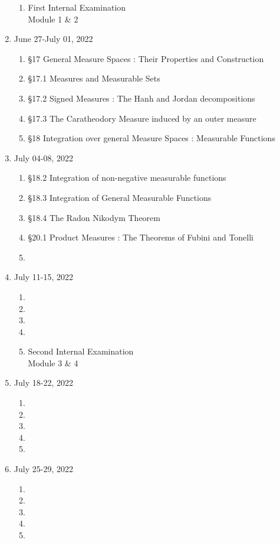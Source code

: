 \begin{enumerate}[label=Week \arabic*]
\begin{enumerate}[label=Day \arabic*]
		\item 
			First Internal Examination \\
			Module 1 \& 2
	\end{enumerate}
	\item June 27-July 01, 2022 
	\begin{enumerate}[label=Day \arabic*]
		\item 
			\S17 General Measure Spaces : Their Properties and Construction
		\item 
			\S17.1 Measures and Measurable Sets
		\item 
			\S17.2 Signed Measures : The Hanh and Jordan decompositions
		\item 
			\S17.3 The Caratheodory Measure induced by an outer measure
		\item 
			\S18 Integration over general Measure Spaces : Measurable Functions
	\end{enumerate}
	\item July 04-08, 2022 
	\begin{enumerate}[label=Day \arabic*]
		\item 
			\S18.2 Integration of non-negative measurable functions
		\item 
			\S18.3 Integration of General Measurable Functions
		\item 
			\S18.4 The Radon Nikodym Theorem
		\item 
			\S20.1 Product Measures : The Theorems of Fubini and Tonelli
		\item  
	\end{enumerate}
	\item July 11-15, 2022 
	\begin{enumerate}[label=Day \arabic*]
		\item 
		\item 
		\item 
		\item 
		\item 
			Second Internal Examination \\
			Module 3 \& 4
	\end{enumerate}
	\item July 18-22, 2022 
	\begin{enumerate}[label=Day \arabic*]
		\item 
		\item 
		\item 
		\item 
		\item 
	\end{enumerate}
	\item July 25-29, 2022 
	\begin{enumerate}[label=Day \arabic*]
		\item 
		\item 
		\item 
		\item 
		\item 
	\end{enumerate}
\end{enumerate}
